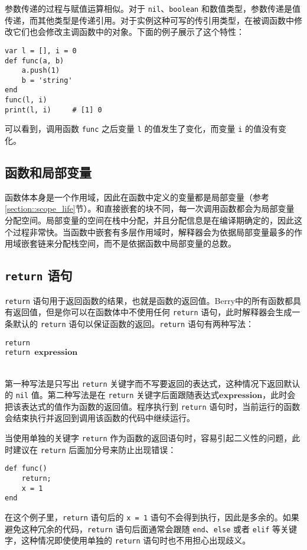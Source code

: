参数传递的过程与赋值运算相似。对于 \texttt{nil}、\texttt{boolean} 和数值类型，参数传递是值传递，而其他类型是传递引用。对于实例这种可写的传引用类型，在被调函数中修改它们也会修改主调函数中的对象。下面的例子展示了这个特性：
\begin{lstlisting}[language=berry]
var l = [], i = 0
def func(a, b)
    a.push(1)
    b = 'string'
end
func(l, i)
print(l, i)     # [1] 0
\end{lstlisting}
可以看到，调用函数 \texttt{func} 之后变量 \texttt{l} 的值发生了变化，而变量 \texttt{i} 的值没有变化。

\subsection{函数和局部变量}

函数体本身是一个作用域，因此在函数中定义的变量都是局部变量（参考\ref{section::scope_life}节）。和直接嵌套的块不同，每一次调用函数都会为局部变量分配空间。局部变量的空间在栈中分配，并且分配信息是在编译期确定的，因此这个过程非常快。当函数中嵌套有多层作用域时，解释器会为依据局部变量最多的作用域嵌套链来分配栈空间，而不是依据函数中局部变量的总数。

\subsection{\texttt{return} 语句}

\texttt{return} 语句用于返回函数的结果，也就是函数的返回值。Berry中的所有函数都具有返回值，但是你可以在函数体中不使用任何 \texttt{return} 语句，此时解释器会生成一条默认的 \texttt{return} 语句以保证函数的返回。\texttt{return} 语句有两种写法：
\begin{algorithm}
    \texttt{return} \\
    \texttt{return }$\bm{expression}$
\end{algorithm}\vspace{-0.6em}\\
第一种写法是只写出 \texttt{return} 关键字而不写要返回的表达式，这种情况下返回默认的 \texttt{nil} 值。第二种写法是在 \texttt{return} 关键字后面跟随表达式$\bm{expression}$，此时会把该表达式的值作为函数的返回值。程序执行到 \texttt{return} 语句时，当前运行的函数会结束执行并返回到调用该函数的代码中继续运行。

当使用单独的关键字 \texttt{return} 作为函数的返回语句时，容易引起二义性的问题，此时建议在 \texttt{return} 后面加分号来防止出现错误：
\begin{lstlisting}[language=berry, numbers=none]
def func()
    return;
    x = 1
end
\end{lstlisting}
在这个例子里，\texttt{return} 语句后的 \texttt{x = 1} 语句不会得到执行，因此是多余的。如果避免这种冗余的代码，\texttt{return} 语句后面通常会跟随 \texttt{end}、\texttt{else} 或者 \texttt{elif} 等关键字，这种情况即使使用单独的 \texttt{return} 语句时也不用担心出现歧义。

